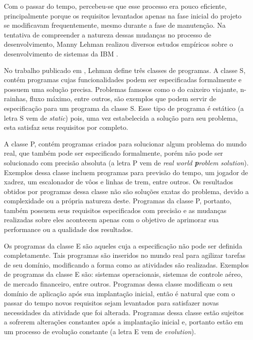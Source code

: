\documentclass[a4paper, 12pt, twoside]{book}
\begin{document}
        Com o passar do tempo, percebeu-se que esse processo era pouco eficiente, 
        principalmente porque os requisitos levantados apenas na fase inicial do projeto se 
        modificavam frequentemente, mesmo durante a fase de manutenção. Na tentativa de compreender
        a natureza dessas mudanças no processo de desenvolvimento, Manny Lehman realizou diversos 
        estudos empíricos sobre o desenvolvimento de sistemas da IBM \cite{Lehman2,Lehman1980b,Lehman1985}.
        
        No trabalho publicado em \cite{Lehman1980b}, Lehman define três classes de programas.
        A classe S, contém programas cujas funcionalidades podem ser especificadas formalmente e possuem uma 
        solução precisa. Problemas famosos como o do caixeiro viajante, n-rainhas, fluxo máximo, entre outros,
        são exemplos que podem servir de especificação para um programa da classe S. Esse 
        tipo de programa é estático (a letra S vem de \textit{static}) pois, uma vez estabelecida a 
        solução para seu problema, esta satisfaz seus requisitos por completo.
        
        A classe P, contém programas criados para solucionar algum problema do mundo real, que também  pode ser 
        especificado formalmente, porém não pode ser solucionado com precisão absoluta (a letra P 
        vem de \textit{real world \textbf{p}roblem solution}). Exemplos
        dessa classe incluem programas para previsão do tempo, um jogador de xadrez, um 
        escalonador de vôos e linhas de trem, entre outros. Os resultados obtidos por programas dessa
        classe não são soluções exatas do problema, devido a complexidade ou a própria natureza deste.
        Programas da classe P, portanto, também possuem seus requisitos especificados com precisão e 
        as mudanças realizadas sobre eles acontecem apenas com o objetivo de aprimorar sua performance ou a qualidade dos resultados.
        
        Os programas da classe E são aqueles cuja a especificação não pode ser definida completamente.
        Tais programas são inseridos no mundo real para agilizar tarefas de seu domínio, modificando 
        a forma como as atividades são realizadas. Exemplos de programas da classe E são: sistemas 
        operacionais, sistemas de controle aéreo, de mercado financeiro, entre outros. Programas 
        dessa classe modificam o seu domínio de aplicação após sua implantação inicial, então é 
        natural que com o passar do tempo novos requisitos sejam levantados para satisfazer 
        novas necessidades da atividade que foi alterada. Programas dessa classe estão
        sujeitos a sofrerem alterações constantes após a implantação inicial e, portanto estão
        em um processo de evolução constante (a letra E vem de \textit{evolution}).
        
\end{document}
